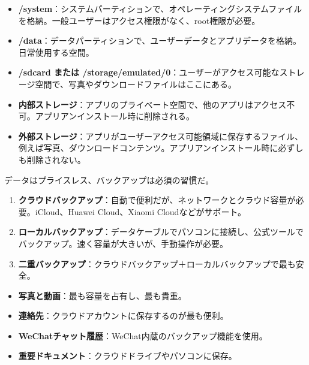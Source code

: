 
\begin{itemize}
  \item \textbf{/system}：システムパーティションで、オペレーティングシステムファイルを格納。一般ユーザーはアクセス権限がなく、root権限が必要。
  \item \textbf{/data}：データパーティションで、ユーザーデータとアプリデータを格納。日常使用する空間。
  \item \textbf{/sdcard または /storage/emulated/0}：ユーザーがアクセス可能なストレージ空間で、写真やダウンロードファイルはここにある。
\end{itemize}


\begin{itemize}
  \item \textbf{内部ストレージ}：アプリのプライベート空間で、他のアプリはアクセス不可。アプリアンインストール時に削除される。
  \item \textbf{外部ストレージ}：アプリがユーザーアクセス可能領域に保存するファイル、例えば写真、ダウンロードコンテンツ。アプリアンインストール時に必ずしも削除されない。
\end{itemize}


データはプライスレス、バックアップは必須の習慣だ。


\begin{enumerate}
  \item \textbf{クラウドバックアップ}：自動で便利だが、ネットワークとクラウド容量が必要。iCloud、Huawei Cloud、Xiaomi Cloudなどがサポート。
  \item \textbf{ローカルバックアップ}：データケーブルでパソコンに接続し、公式ツールでバックアップ。速く容量が大きいが、手動操作が必要。
  \item \textbf{二重バックアップ}：クラウドバックアップ＋ローカルバックアップで最も安全。
\end{enumerate}


\begin{itemize}
  \item \textbf{写真と動画}：最も容量を占有し、最も貴重。
  \item \textbf{連絡先}：クラウドアカウントに保存するのが最も便利。
  \item \textbf{WeChatチャット履歴}：WeChat内蔵のバックアップ機能を使用。
  \item \textbf{重要ドキュメント}：クラウドドライブやパソコンに保存。
\end{itemize}

